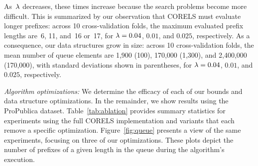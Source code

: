 As~${\lambda}$ decreases, these times increase because the search problems become more difficult.
%
This is summarized by our observation that CORELS must evaluate longer prefixes:
across 10 cross-validation folds, the maximum evaluated prefix lengths are~6,
11, and~16 or~17, for ${{\lambda} = 0.04}$, $0.01$, and $0.025$, respectively.
%
As a consequence, our data structures grow in size: \eg
across 10 cross-validation folds, the mean number of queue elements are
1,900 (100), 170,000 (1,300), and 2,400,000 (170,000),
with standard deviations shown in parentheses,
for ${{\lambda} = 0.04}$, $0.01$, and $0.025$, respectively.


\textit{Algorithm optimizations:}
We determine the efficacy of each of our bounds and data structure optimizations.
%
In the remainder, we show results using the ProPublica dataset.
%
Table~\ref{tab:ablation} provides summary statistics for experiments using
the full CORELS implementation and variants that each remove a specific optimization.
%
Figure~\ref{fig:queue} presents a view of the same experiments, focusing
on three of our optimizations. These plots depict the number of
prefixes of a given length in the queue during the algorithm's execution.

\begin{table}[t!]
\centering
{}
\vspace{4mm}
\caption{Per-component performance improvement.
%
The columns report total execution time,
time to optimum, number of queue insertions,
maximum queue size, and maximum evaluated prefix length.
%
The first row shows CORELS; subsequent rows show variants
that each remove a specific implementation optimization or bound.
%
We terminated each experiment in the last row once the size of the
trie reached ${10^9}$ nodes (each execution consumed $\sim$350GB RAM).
%
In all but the final row and column, we report means
(and standard deviations) over 10 cross-validation folds;
in the final row, we report the minimum values across folds.
}
\label{tab:ablation}
\end{table}

